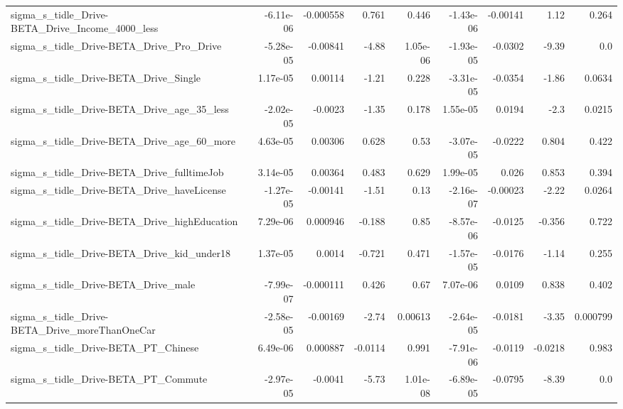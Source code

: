 \begin{tabular}{lrrrrrrrr}
sigma\_s\_tidle\_Drive-BETA\_Drive\_Income\_4000\_less    &   -6.11e-06 &    -0.000558 &     0.761 &    0.446 &  -1.43e-06 &    -0.00141 &         1.12 &         0.264 \\
sigma\_s\_tidle\_Drive-BETA\_Drive\_Pro\_Drive           &   -5.28e-05 &     -0.00841 &     -4.88 & 1.05e-06 &  -1.93e-05 &     -0.0302 &        -9.39 &           0.0 \\
sigma\_s\_tidle\_Drive-BETA\_Drive\_Single              &    1.17e-05 &      0.00114 &     -1.21 &    0.228 &  -3.31e-05 &     -0.0354 &        -1.86 &        0.0634 \\
sigma\_s\_tidle\_Drive-BETA\_Drive\_age\_35\_less         &   -2.02e-05 &      -0.0023 &     -1.35 &    0.178 &   1.55e-05 &      0.0194 &         -2.3 &        0.0215 \\
sigma\_s\_tidle\_Drive-BETA\_Drive\_age\_60\_more         &    4.63e-05 &      0.00306 &     0.628 &     0.53 &  -3.07e-05 &     -0.0222 &        0.804 &         0.422 \\
sigma\_s\_tidle\_Drive-BETA\_Drive\_fulltimeJob         &    3.14e-05 &      0.00364 &     0.483 &    0.629 &   1.99e-05 &       0.026 &        0.853 &         0.394 \\
sigma\_s\_tidle\_Drive-BETA\_Drive\_haveLicense         &   -1.27e-05 &     -0.00141 &     -1.51 &     0.13 &  -2.16e-07 &    -0.00023 &        -2.22 &        0.0264 \\
sigma\_s\_tidle\_Drive-BETA\_Drive\_highEducation       &    7.29e-06 &     0.000946 &    -0.188 &     0.85 &  -8.57e-06 &     -0.0125 &       -0.356 &         0.722 \\
sigma\_s\_tidle\_Drive-BETA\_Drive\_kid\_under18         &    1.37e-05 &       0.0014 &    -0.721 &    0.471 &  -1.57e-05 &     -0.0176 &        -1.14 &         0.255 \\
sigma\_s\_tidle\_Drive-BETA\_Drive\_male                &   -7.99e-07 &    -0.000111 &     0.426 &     0.67 &   7.07e-06 &      0.0109 &        0.838 &         0.402 \\
sigma\_s\_tidle\_Drive-BETA\_Drive\_moreThanOneCar      &   -2.58e-05 &     -0.00169 &     -2.74 &  0.00613 &  -2.64e-05 &     -0.0181 &        -3.35 &      0.000799 \\
sigma\_s\_tidle\_Drive-BETA\_PT\_Chinese                &    6.49e-06 &     0.000887 &   -0.0114 &    0.991 &  -7.91e-06 &     -0.0119 &      -0.0218 &         0.983 \\
sigma\_s\_tidle\_Drive-BETA\_PT\_Commute                &   -2.97e-05 &      -0.0041 &     -5.73 & 1.01e-08 &  -6.89e-05 &     -0.0795 &        -8.39 &           0.0 \\

\end{tabular}
